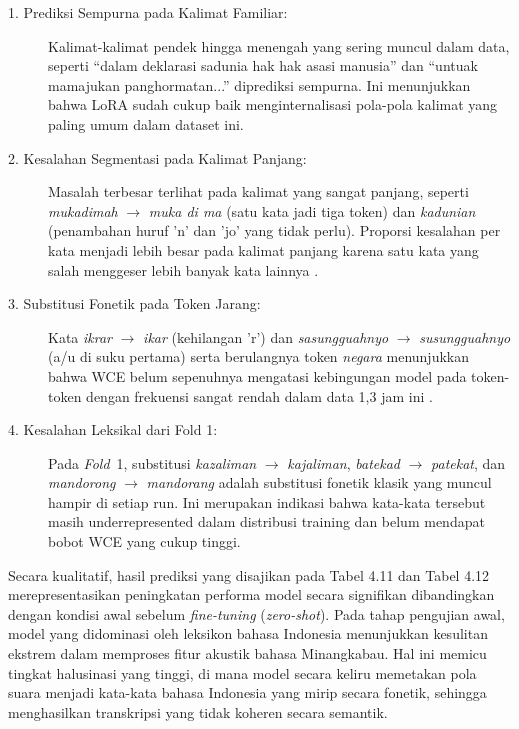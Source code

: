\begin{description}
    \item[1. Prediksi Sempurna pada Kalimat Familiar:] Kalimat-kalimat pendek hingga menengah yang sering muncul dalam data, seperti ``dalam deklarasi sadunia hak hak asasi manusia'' dan ``untuak mamajukan panghormatan...'' diprediksi sempurna. Ini menunjukkan bahwa LoRA sudah cukup baik menginternalisasi pola-pola kalimat yang paling umum dalam dataset ini.

    \item[2. Kesalahan Segmentasi pada Kalimat Panjang:] Masalah terbesar terlihat pada kalimat yang sangat panjang, seperti \textit{mukadimah} $\rightarrow$ \textit{muka di ma} (satu kata jadi tiga token) dan \textit{kadunian} (penambahan huruf 'n' dan 'jo' yang tidak perlu). Proporsi kesalahan per kata menjadi lebih besar pada kalimat panjang karena satu kata yang salah menggeser lebih banyak kata lainnya \cite{sovia2022minangkabau}.

    \item[3. Substitusi Fonetik pada Token Jarang:] Kata \textit{ikrar} $\rightarrow$ \textit{ikar} (kehilangan 'r') dan \textit{sasungguahnyo} $\rightarrow$ \textit{susungguahnyo} (a/u di suku pertama) serta berulangnya token \textit{negara} menunjukkan bahwa WCE belum sepenuhnya mengatasi kebingungan model pada token-token dengan frekuensi sangat rendah dalam data 1,3 jam ini \cite{pineiromartin2024weighted}.

    \item[4. Kesalahan Leksikal dari Fold 1:] Pada \textit{Fold}~1, substitusi \textit{kazaliman} $\rightarrow$ \textit{kajaliman}, \textit{batekad} $\rightarrow$ \textit{patekat}, dan \textit{mandorong} $\rightarrow$ \textit{mandorang} adalah substitusi fonetik klasik yang muncul hampir di setiap run. Ini merupakan indikasi bahwa kata-kata tersebut masih underrepresented dalam distribusi training dan belum mendapat bobot WCE yang cukup tinggi.
\end{description}

Secara kualitatif, hasil prediksi yang disajikan pada Tabel 4.11 dan Tabel 4.12 merepresentasikan peningkatan performa model secara signifikan dibandingkan dengan kondisi awal sebelum \textit{fine-tuning} (\textit{zero-shot}). Pada tahap pengujian awal, model yang didominasi oleh leksikon bahasa Indonesia menunjukkan kesulitan ekstrem dalam memproses fitur akustik bahasa Minangkabau. Hal ini memicu tingkat halusinasi yang tinggi, di mana model secara keliru memetakan pola suara menjadi kata-kata bahasa Indonesia yang mirip secara fonetik, sehingga menghasilkan transkripsi yang tidak koheren secara semantik.

